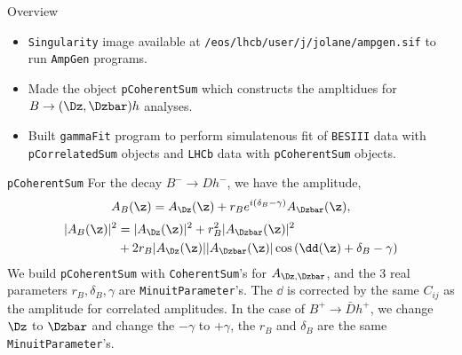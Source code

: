 \newcommand{\pulldiststf}[2]{
\pulldisttf{#1}{Comb}{Combined Tags using #2}
\pulldisttf{#1}{KK}{$\KK$ Tag using #2}
\pulldisttf{#1}{Kspi0}{$\Kspiz$ Tag using #2}
\pulldisttf{#1}{Kppim}{$\Kppim$ Tag using #2}
\pulldisttf{#1}{Kmpip}{$\Kmpip$ Tag using #2}
\pulldisttf{#1}{Kspipi}{$\Kspipi$ Tag using #2}

}
\begin{frame}{Overview}
    \begin{itemize}
            \item \texttt{Singularity} image available at \texttt{/eos/lhcb/user/j/jolane/ampgen.sif} to run \texttt{AmpGen} programs.
            \item Made the object \texttt{pCoherentSum} which constructs the ampltidues for $B \to (\Dz,\Dzbar) h$ analyses.
            \item Built \texttt{gammaFit} program to perform simulatenous fit of \texttt{BESIII} data with \texttt{pCorrelatedSum} objects and \texttt{LHCb} data with \texttt{pCoherentSum} objects.
    \end{itemize}
\end{frame}
\begin{frame}{\texttt{pCoherentSum}}
        For the decay $B^- \to D h^-$, we have the amplitude,
	\begin{equation}
                        A_B(\z) = A_{\Dz}(\z) + r_B e^{i \left(\delta_B - \gamma\right)} A_{\Dzbar}(\z), 
	\end{equation}
        \begin{equation}
                \begin{split}
			|A_B(\z)|^2 &= |A_{\Dz}(\z)|^2 + r_B^2 |A_{\Dzbar}(\z)|^2 \\ &+ 2 r_B |A_{\Dz}(\z)||A_{\Dzbar}(\z)| \cos \left(\dd(\z) + \delta_B - \gamma\right)
                \end{split}
        \end{equation}
        We build \texttt{pCoherentSum} with \texttt{CoherentSum}'s for $A_{\Dz, \Dzbar}$, and the 3 real parameters $r_B, \delta_B, \gamma$ are \texttt{MinuitParameter}'s. 
        The $\dd$ is corrected by the same $C_{ij}$ as the amplitude for correlated amplitudes.
        In the case of $B^+ \to \bar{D} h^+$, we change $\Dz$ to $\Dzbar$ and change the $-\gamma$ to $+\gamma$, the $r_B$ and $\delta_B$ are the same \texttt{MinuitParameter}'s.
        
   \end{frame}
   
